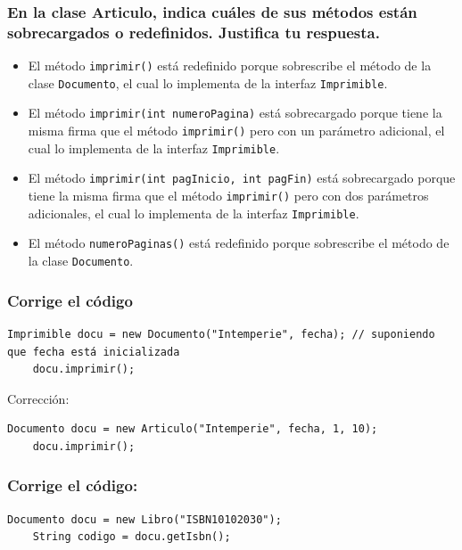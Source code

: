 \documentclass[a4paper,12pt]{article}
\begin{document}
\subsubsection*{En la clase Articulo, indica cuáles de sus métodos están sobrecargados o redefinidos. Justifica tu respuesta.}

\begin{itemize}
    \item El método \texttt{imprimir()} está redefinido porque sobrescribe el método de la clase \texttt{Documento}, el cual lo implementa de la interfaz \texttt{Imprimible}.
    \item El método \texttt{imprimir(int numeroPagina)} está sobrecargado porque tiene la misma firma que el método \texttt{imprimir()} pero con un parámetro adicional, el cual lo implementa de la interfaz \texttt{Imprimible}.
    \item El método \texttt{imprimir(int pagInicio, int pagFin)} está sobrecargado porque tiene la misma firma que el método \texttt{imprimir()} pero con dos parámetros adicionales, el cual lo implementa de la interfaz \texttt{Imprimible}.
    \item El método \texttt{numeroPaginas()} está redefinido porque sobrescribe el método de la clase \texttt{Documento}.
\end{itemize}

\subsubsection*{Corrige el código}

    \begin{lstlisting}[style=customjava, caption = {Código a corregir}]
    Imprimible docu = new Documento("Intemperie", fecha); // suponiendo que fecha está inicializada
    docu.imprimir();
    \end{lstlisting}

Corrección:
\begin{lstlisting}[style=customjava, caption={Corrección del código}]
    Documento docu = new Articulo("Intemperie", fecha, 1, 10);
    docu.imprimir();
\end{lstlisting}

\subsubsection*{Corrige el código:}
    \begin{lstlisting}[style=customjava, caption = {Código a corregir}]
    Documento docu = new Libro("ISBN10102030");
    String codigo = docu.getIsbn();
    \end{lstlisting}
\end{document}
